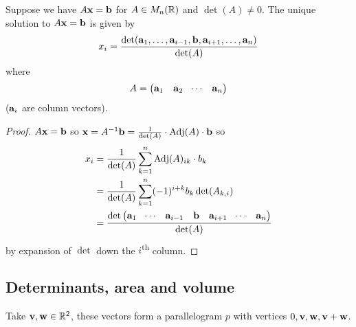 \documentclass[10pt, a4paper]{article}
\newcommand{\ts}[1]{\textsuperscript{#1}}
\begin{document}
\begin{proposition}
    Suppose we have $A\mathbf{x} = \mathbf{b}$ for $A \in M_n(\mathbb{R})$ and $\det(A) \neq 0$.
    The unique solution to $A\mathbf{x} = \mathbf{b}$ is given by
    \[
    x_i = \frac{\det(\mathbf{a}_1, \dotsc, \mathbf{a}_{i - 1}, \mathbf{b}, \mathbf{a}_{i + 1}, \dotsc, \mathbf{a}_n)}{\det(A)}
    \]
    where
    \[
    A = \begin{pmatrix}
        \mathbf{a}_1 & \mathbf{a}_2 & \dotsi & \mathbf{a}_n
    \end{pmatrix}
    \]
    ($\mathbf{a}_i$ are column vectors).
    \begin{proof}
        $A\mathbf{x} = \mathbf{b}$ so $\mathbf{x} = A ^ {-1}\mathbf{b} = \frac{1}{\det(A)}\cdot\operatorname{Adj}(A) \cdot \mathbf{b}$
        so
        \begin{align*}
            x_i &= \frac{1}{\det(A)}\sum_{k = 1}^{n}\operatorname{Adj}(A)_{ik} \cdot b_k \\
            &= \frac{1}{\det(A)}\sum_{k = 1}^{n}(-1) ^ {i + k}b_k\det(A_{k, i}) \\
            &= \frac{\det\begin{pmatrix}
                \mathbf{a}_1 & \dotsi & \mathbf{a}_{i - 1} & \mathbf{b} & \mathbf{a}_{i + 1} & \dotsi & \mathbf{a}_n
            \end{pmatrix}}{
            \det(A)}
        \end{align*}
        by expansion of $\det$ down the $i$\ts{th} column.
    \end{proof}
\end{proposition}

\subsection{Determinants, area and volume}

Take $\mathbf{v, w} \in \mathbb{R} ^ 2$,
these vectors form a parallelogram $p$ with vertices $0, \mathbf{v}, \mathbf{w}, \mathbf{v + w}$.
\end{document}
